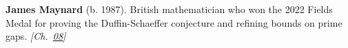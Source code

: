 \textbf{James Maynard} (b. 1987). British mathematician who won the 2022 Fields Medal for proving the Duffin-Schaeffer conjecture and refining bounds on prime gaps. \emph{[Ch.~\hyperref[ch:boundedprimegaps]{08}]}

